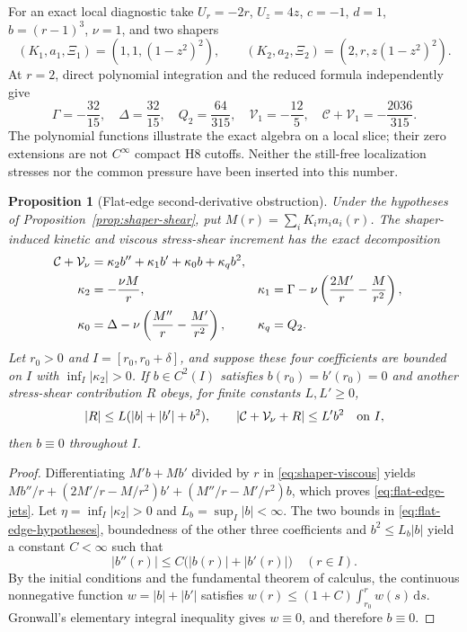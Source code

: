 \documentclass[11pt,a4paper]{article}
\theoremstyle{plain}
\newtheorem{proposition}[theorem]{Proposition}
\theoremstyle{definition}
\newcommand{\dd}{\,\mathrm{d}}
\begin{document}
For an exact local diagnostic take
$U_r=-2r$, $U_z=4z$, $c=-1$, $d=1$,
$b=(r-1)^3$, $\nu=1$, and two shapers
\[
 (K_1,a_1,\Xi_1)=(1,1,(1-z^2)^2),\qquad
 (K_2,a_2,\Xi_2)=(2,r,z(1-z^2)^2).
\]
At $r=2$, direct polynomial integration and the reduced formula
independently give
\begin{equation}\label{eq:shaper-rational-example}
 \Gamma=-\frac{32}{15},\quad \Delta=\frac{32}{15},\quad
 Q_2=\frac{64}{315},\quad\mathcal V_1=-\frac{12}{5},\quad
 \mathcal C+\mathcal V_1=-\frac{2036}{315}.
\end{equation}
The polynomial functions illustrate the exact algebra on a local
slice; their zero extensions are not $C^\infty$ compact H8 cutoffs.
Neither the still-free localization stresses nor the common pressure
have been inserted into this number.

\begin{proposition}[Flat-edge second-derivative obstruction]
\label{prop:flat-edge}
Under the hypotheses of Proposition~\ref{prop:shaper-shear}, put
$M(r)=\sum_iK_i m_i a_i(r)$. The shaper-induced kinetic and
viscous stress-shear increment has the exact decomposition
\begin{align}
 \mathcal C+\mathcal V_\nu
 &=\kappa_2b''+\kappa_1b'+\kappa_0b+\kappa_qb^2,
 \label{eq:flat-edge-jets}\\
 \kappa_2&=-\frac{\nu M}{r},&
 \kappa_1&=\Gamma-\nu\left(\frac{2M'}r-\frac M{r^2}\right),\notag\\
 \kappa_0&=\Delta-\nu\left(\frac{M''}r-\frac{M'}{r^2}\right),&
 \kappa_q&=Q_2.\notag
\end{align}
Let $r_0>0$ and $I=[r_0,r_0+\delta]$, and suppose these four
coefficients are bounded on $I$ with
$\inf_I|\kappa_2|>0$. If $b\in C^2(I)$ satisfies
$b(r_0)=b'(r_0)=0$ and another stress-shear contribution $R$
obeys, for finite constants $L,L'\ge0$,
\begin{equation}\label{eq:flat-edge-hypotheses}
 |R|\le L(|b|+|b'|+b^2),\qquad
 |\mathcal C+\mathcal V_\nu+R|\le L'b^2
 \quad\hbox{on }I,
\end{equation}
then $b\equiv0$ throughout $I$.
\end{proposition}

\begin{proof}
Differentiating $M'b+Mb'$ divided by $r$ in
\eqref{eq:shaper-viscous} yields
$M b''/r+(2M'/r-M/r^2)b'+(M''/r-M'/r^2)b$,
which proves \eqref{eq:flat-edge-jets}. Let
$\eta=\inf_I|\kappa_2|>0$ and $L_b=\sup_I|b|<\infty$.
The two bounds in \eqref{eq:flat-edge-hypotheses}, boundedness of
the other three coefficients and $b^2\le L_b|b|$ yield a
constant $C<\infty$ such that
\[
 |b''(r)|\le C\bigl(|b(r)|+|b'(r)|\bigr)
 \quad(r\in I).
\]
By the initial conditions and the fundamental theorem of calculus,
the continuous nonnegative function $w=|b|+|b'|$ satisfies
$w(r)\le(1+C)\int_{r_0}^r w(s)\dd s$. Gronwall's elementary
integral inequality gives $w\equiv0$, and therefore $b\equiv0$.
\end{proof}
\end{document}
